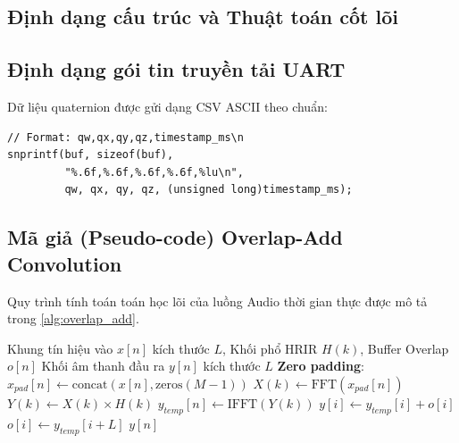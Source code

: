 \renewcommand{\bibname}{Tài liệu tham khảo}



\begin{appendices}
\chapter{Định dạng cấu trúc và Thuật toán cốt lõi}

\section{Định dạng gói tin truyền tải UART}
Dữ liệu quaternion được gửi dạng CSV ASCII theo chuẩn:
\begin{lstlisting}[style=cstyle, caption={Ví dụ format gói tin UART dạng CSV}, label={lst:uart_packet}]
// Format: qw,qx,qy,qz,timestamp_ms\n
snprintf(buf, sizeof(buf),
         "%.6f,%.6f,%.6f,%.6f,%lu\n",
         qw, qx, qy, qz, (unsigned long)timestamp_ms);
\end{lstlisting}

\section{Mã giả (Pseudo-code) Overlap-Add Convolution}
Quy trình tính toán toán học lõi của luồng Audio thời gian thực được mô tả trong \cref{alg:overlap_add}.

\begin{algorithm}[H]
\caption{Thuật toán Overlap-Add thời gian thực}
\label{alg:overlap_add}
\begin{algorithmic}[1]
\Require Khung tín hiệu vào $x[n]$ kích thước $L$, Khối phổ HRIR $H(k)$, Buffer Overlap $o[n]$
\Ensure Khối âm thanh đầu ra $y[n]$ kích thước $L$
\State \textbf{Zero padding}: $x_{pad}[n] \gets \text{concat}(x[n], \text{zeros}(M-1))$
\State $X(k) \gets \text{FFT}(x_{pad}[n])$
\State $Y(k) \gets X(k) \times H(k)$ 
\State $y_{temp}[n] \gets \text{IFFT}(Y(k))$
    \State $y[i] \gets y_{temp}[i] + o[i]$ 
\EndFor
{}
    \State $o[i] \gets y_{temp}[i+L]$ 
\EndFor
\State \Return $y[n]$
\end{algorithmic}
\end{algorithm}

\end{appendices}


